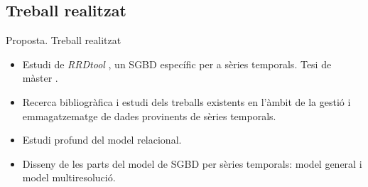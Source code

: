 \subsection{Treball realitzat}
\begin{frame}{Proposta. Treball realitzat}

  \begin{itemize}
  \item Estudi de \emph{RRDtool} \parencite{rrdtool}, un SGBD
    específic per a sèries temporals. Tesi de
    màster \parencite{llusa11:tfm}.

  \item Recerca bibliogràfica i estudi dels treballs existents en
    l'àmbit de la gestió i emmagatzematge de dades provinents de
    sèries temporals.

  \item Estudi profund del model relacional. 

  \item Disseny de les parts del model de SGBD per sèries temporals:
    model general i model multiresolució.

  \end{itemize}

\end{frame}


